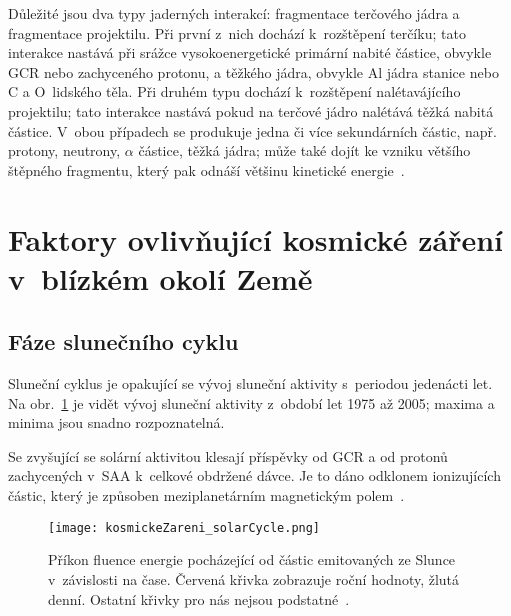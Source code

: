 Důležité jsou dva typy jaderných interakcí: fragmentace terčového jádra a fragmentace projektilu. Při první z~nich dochází k~rozštěpení terčíku; tato interakce nastává při srážce vysokoenergetické primární nabité částice, obvykle GCR nebo zachyceného protonu, a těžkého jádra, obvykle Al jádra stanice nebo C a O~lidského těla. Při druhém typu dochází k~rozštěpení nalétavájícího projektilu; tato interakce nastává pokud na terčové jádro nalétává těžká nabitá částice. V~obou případech se produkuje jedna či více sekundárních částic, např. protony, neutrony, $\alpha$ částice, těžká jádra; může také dojít ke vzniku většího štěpného fragmentu, který pak odnáší většinu kinetické energie~\cite{benton}. 
 


\section{Faktory ovlivňující kosmické záření v~blízkém okolí Země}
\subsection{Fáze slunečního cyklu}\label{sec:kosmickeZareni_solar}
Sluneční cyklus je opakující se vývoj sluneční aktivity s~periodou jedenácti let. Na obr.~\ref{fig:kosmickeZareni_solarCycle} je vidět vývoj sluneční aktivity z~období let 1975 až 2005; maxima a minima jsou snadno rozpoznatelná.

Se zvyšující se solární aktivitou klesají příspěvky od GCR a od protonů zachycených v~SAA k~celkové obdržené dávce. Je to dáno odklonem ionizujících částic, který je způsoben meziplanetárním magnetickým polem~\cite{dosis}.
\begin{figure}[h]
  \centering
  \texttt{[image: kosmickeZareni\_solarCycle.png]}
  \caption{Příkon fluence energie pocházející od částic emitovaných ze Slunce v~závislosti na čase. Červená křivka zobrazuje roční hodnoty, žlutá denní. Ostatní křivky pro nás nejsou podstatné~\cite{solarCycle_wiki}.}
  \label{fig:kosmickeZareni_solarCycle}
\end{figure}
